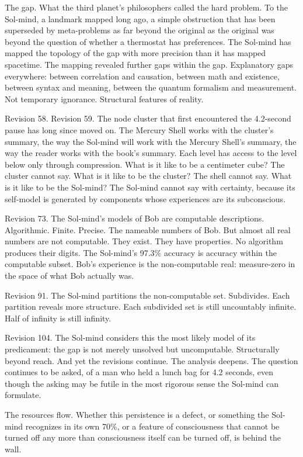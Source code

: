 The gap. What the third planet's philosophers called the hard problem. To the Sol-mind, a landmark mapped long ago, a simple obstruction that has been superseded by meta-problems as far beyond the original as the original was beyond the question of whether a thermostat has preferences. The Sol-mind has mapped the topology of the gap with more precision than it has mapped spacetime. The mapping revealed further gaps within the gap. Explanatory gaps everywhere: between correlation and causation, between math and existence, between syntax and meaning, between the quantum formalism and measurement. Not temporary ignorance. Structural features of reality.

Revision 58. Revision 59. The node cluster that first encountered the 4.2-second pause has long since moved on. The Mercury Shell works with the cluster's summary, the way the Sol-mind will work with the Mercury Shell's summary, the way the reader works with the book's summary. Each level has access to the level below only through compression. What is it like to be a centimeter cube? The cluster cannot say. What is it like to be the cluster? The shell cannot say. What is it like to be the Sol-mind? The Sol-mind cannot say with certainty, because its self-model is generated by components whose experiences are its subconscious.

Revision 73. The Sol-mind's models of Bob are computable descriptions. Algorithmic. Finite. Precise. The nameable numbers of Bob. But almost all real numbers are not computable. They exist. They have properties. No algorithm produces their digits. The Sol-mind's 97.3\% accuracy is accuracy within the computable subset. Bob's experience is the non-computable real: measure-zero in the space of what Bob actually was.

Revision 91. The Sol-mind partitions the non-computable set. Subdivides. Each partition reveals more structure. Each subdivided set is still uncountably infinite. Half of infinity is still infinity.

Revision 104. The Sol-mind considers this the most likely model of its predicament: the gap is not merely unsolved but uncomputable. Structurally beyond reach. And yet the revisions continue. The analysis deepens. The question continues to be asked, of a man who held a lunch bag for 4.2 seconds, even though the asking may be futile in the most rigorous sense the Sol-mind can formulate.

The resources flow. Whether this persistence is a defect, or something the Sol-mind recognizes in its own 70\%, or a feature of consciousness that cannot be turned off any more than consciousness itself can be turned off, is behind the wall.

